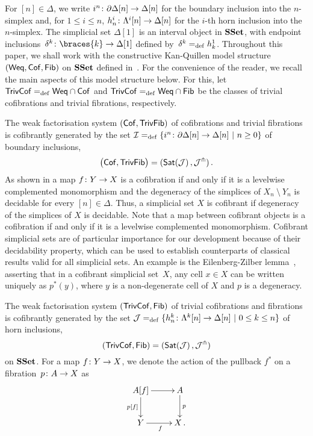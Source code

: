 \documentclass[reqno,10pt,a4paper,oneside,draft]{amsart}
\begin{document}
For $[n] \in \Delta$, we write $i^n \colon  \partial \Delta[n] \to \Delta[n]$ for the boundary inclusion into the $n$-simplex and, for $1 \leq i \leq n$,  
$h^i_n  \colon \Lambda^i[n] \to \Delta[n]$  for the $i$-th horn inclusion into the $n$-simplex. The simplicial set $\Delta[1]$ is an interval object in $\mathbf{SSet}$, with endpoint inclusions~$\kcyl \co \braces{ k} \to \Delta[1]$ defined by~$\delta^k =_{\operatorname{def}} h^1_k$. Throughout this paper, we shall work  with the constructive 
Kan-Quillen model structure $(\mathsf{Weq}, \mathsf{Cof}, \mathsf{Fib})$ on $\mathbf{SSet}$ defined in~\cite{henry2019qms}. 
For the convenience of the reader, we recall the main aspects of this model structure below.
For this, let $\mathsf{TrivCof} =_{\operatorname{def}} \mathsf{Weq} \cap \mathsf{Cof}$ and $\mathsf{TrivCof} =_{\operatorname{def}} \mathsf{Weq} \cap \mathsf{Fib}$ be the classes of trivial cofibrations and trivial fibrations,
respectively. 

The weak factorisation system $(\mathsf{Cof}, \mathsf{TrivFib})$ of cofibrations and trivial fibrations  is cofibrantly generated by the set $\mathcal{I} =_{\operatorname{def}} \{ i^n \colon  \partial \Delta[n] \to \Delta[n] \ | \ n \geq 0 \}$  of boundary 
inclusions, \ie 
\[
\big( \mathsf{Cof}, \mathsf{TrivFib} \big) = ( \mathsf{Sat}(\mathcal{J}) \, , \mathcal{J}^\pitchfork) \, .
\]
As shown in \cite[proposition 5.1.4]{henry2018wms} a map $f \colon Y \to X$ is a cofibration if  and only if 
it is a levelwise complemented monomorphism and the degeneracy of the simplices of $X_n ~\setminus~Y_n$ is decidable for every $[n] \in \Delta$. Thus, a simplicial set $X$ is
cofibrant if  degeneracy of the simplices of $X$ is decidable.
Note that a map between cofibrant objects is a cofibration
if and only if it is a levelwise complemented monomorphism. 
Cofibrant simplicial sets are of particular importance for our development because of their decidability property, which can be used to establish counterparts of classical results valid for all simplicial sets. An example is the Eilenberg-Zilber lemma~\cite[5.1.2]{henry2018wms}, asserting that in a cofibrant simplicial set~$X$, any cell $x \in X$ can be written uniquely as $p^*(y)$, where $y$ is a non-degenerate cell of $X$ and $p$ is a degeneracy. 
\medskip

The weak factorisation system $(\mathsf{TrivCof}, \mathsf{Fib})$ of  trivial cofibrations and fibrations is cofibrantly 
generated by the set $\mathcal{J} =_{\operatorname{def}} \{ h^k_n  \colon \Lambda^k[n] \to \Delta[n]  \ | \ 0 \leq k \leq n \}$ of horn 
inclusions, \ie 
\[
(\mathsf{TrivCof}, \mathsf{Fib}) = ( \mathsf{Sat}(\mathcal{J}) \, , \mathcal{J}^\pitchfork)
\] 
on $\mathbf{SSet}$. For a map $f \colon Y \to X$, we denote the action of the pullback $f^*$ on a fibration~$p \colon A \to X$ as
\[
\xymatrix{
A[f] \ar[r] \ar[d]_{p[f]} & A \ar[d]^{p} \\
Y \ar[r]_f & X \, .}
\]
\end{document}
